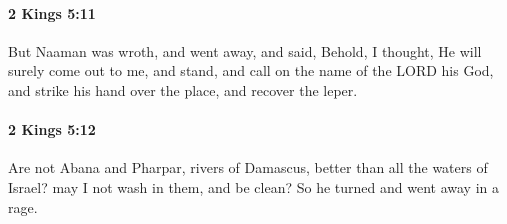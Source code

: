 		\paragraph{2 Kings 5:11} %
			\label{2KINGS-5-11}

			But Naaman was wroth, and went away, and said, Behold, I thought, He will surely come out to me, and stand, and call on the name of the LORD his God, and strike his hand over the place, and recover the leper.


		\paragraph{2 Kings 5:12} %
			\label{2KINGS-5-12}

			Are not Abana and Pharpar, rivers of Damascus, better than all the waters of Israel? may I not wash in them, and be clean? So he turned and went away in a rage.


